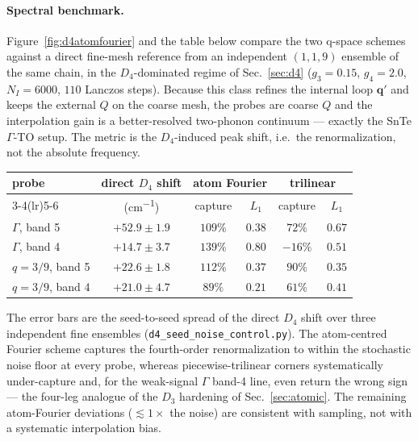 \documentclass[11pt,a4paper]{article}
\newcommand{\qv}{\mathbf{q}}
\begin{document}
\paragraph{Spectral benchmark.}
Figure~\ref{fig:d4atomfourier} and the table below compare the two q-space
schemes against a direct fine-mesh reference from an independent $(1,1,9)$
ensemble of the same chain, in the $D_4$-dominated regime of
Sec.~\ref{sec:d4} ($g_3=0.15$, $g_4=2.0$, $N_I=6000$, $110$ Lanczos
steps).  Because this class refines the internal loop $\qv'$ and keeps the
external $Q$ on the coarse mesh, the probes are coarse $Q$ and the
interpolation gain is a better-resolved two-phonon continuum --- exactly
the SnTe $\Gamma$-TO setup.  The metric is the $D_4$-induced peak shift,
i.e.\ the renormalization, not the absolute frequency.
\begin{center}
\small
\begin{tabular}{lccccc}
\toprule
probe & direct $D_4$ shift & \multicolumn{2}{c}{atom Fourier} &
\multicolumn{2}{c}{trilinear} \\
\cmidrule(lr){3-4}\cmidrule(lr){5-6}
& (\si{cm^{-1}}) & capture & $L_1$ & capture & $L_1$ \\
\midrule
$\Gamma$, band 5 & $+52.9\pm1.9$ & $109\%$ & $0.38$ & $72\%$ & $0.67$ \\
$\Gamma$, band 4 & $+14.7\pm3.7$ & $139\%$ & $0.80$ & $-16\%$ & $0.51$ \\
$q{=}3/9$, band 5 & $+22.6\pm1.8$ & $112\%$ & $0.37$ & $90\%$ & $0.35$ \\
$q{=}3/9$, band 4 & $+21.0\pm4.7$ & $89\%$ & $0.21$ & $61\%$ & $0.41$ \\
\bottomrule
\end{tabular}
\end{center}
The error bars are the seed-to-seed spread of the direct $D_4$ shift over
three independent fine ensembles
(\texttt{d4\_seed\_noise\_control.py}).  The atom-centred Fourier scheme
captures the fourth-order renormalization to within the stochastic noise
floor at every probe, whereas piecewise-trilinear corners systematically
under-capture and, for the weak-signal $\Gamma$ band-4 line, even return
the wrong sign --- the four-leg analogue of the $D_3$ hardening of
Sec.~\ref{sec:atomic}.  The remaining atom-Fourier deviations
($\lesssim1\times$ the noise) are consistent with sampling, not with a
systematic interpolation bias.
\end{document}
